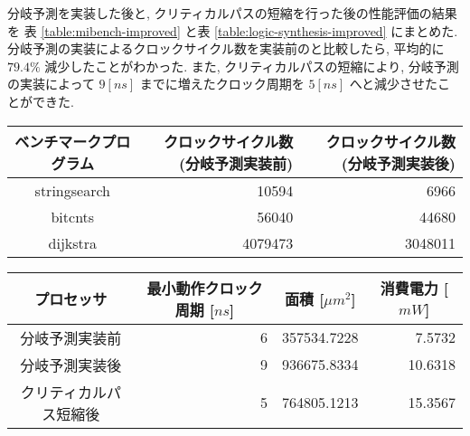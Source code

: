 \documentclass[../improvements.tex]{subfiles}
\begin{document}
  分岐予測を実装した後と, クリティカルパスの短縮を行った後の性能評価の結果を
  表 \ref{table:mibench-improved} と表 \ref{table:logic-synthesis-improved}
  にまとめた.
  分岐予測の実装によるクロックサイクル数を実装前のと比較したら, 
  平均的に $79.4\%$ 減少したことがわかった.
  また, クリティカルパスの短縮により, 分岐予測の実装によって $9[ns]$ までに増えたクロック周期を
  $5[ns]$ へと減少させたことができた.

  \begin{table*}[t]
    \centering
    \begin{tabular}{|c|r|r|}
    \hline
    ベンチマークプログラム  & クロックサイクル数 (分岐予測実装前) & クロックサイクル数 (分岐予測実装後) \\ \hline
    stringsearch & 10594               & 6966                                     \\
    bitcnts      & 56040               & 44680                                    \\
    dijkstra     & 4079473             & 3048011                                  \\ \hline
    \end{tabular}
    \caption{分岐予測実装前後のプログラム実行クロックサイクル数}
    \label{table:mibench-improved}
  \end{table*}

  \begin{table*}[t]
    \centering
    \begin{tabular}{|c|r|r|r|}
    \hline
    プロセッサ       & \multicolumn{1}{c|}{最小動作クロック周期 {[}$ns${]}} & \multicolumn{1}{c|}{面積 {[}$\mu m^2${]}} & \multicolumn{1}{c|}{消費電力 {[}$mW${]}} \\ \hline
    分岐予測実装前         & 6                                        & 357534.7228                                       & 7.5732                             \\
    分岐予測実装後     & 9                                        & 936675.8334                                         & 10.6318                            \\
    クリティカルパス短縮後 & 5                                        & 764805.1213                                         & 15.3567                            \\ \hline
    \end{tabular}
    \caption{性能改善前後の論理合成の結果}
    \label{table:logic-synthesis-improved}
  \end{table*}
\end{document}
